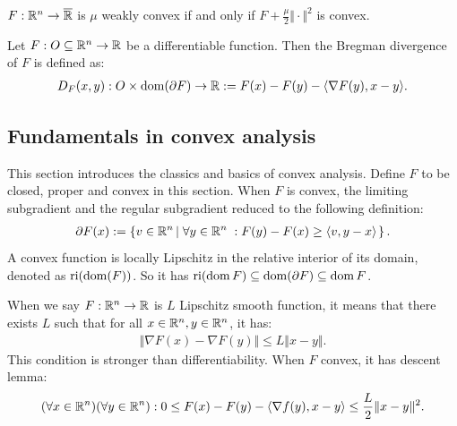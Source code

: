 \documentclass[12pt]{article}
\begin{document}
        \begin{definition}
            $F: \mathbb R^n \rightarrow \overline {\mathbb R}$ is $\mu$ weakly convex if and only if $F + \frac{\mu}{2}\Vert \cdot\Vert^2$ is convex. 
        \end{definition}
        \begin{definition}
            Let $F: O \subseteq \mathbb R^n \rightarrow \mathbb R$ be a differentiable function. 
            Then the Bregman divergence of $F$ is defined as: 
            \begin{align*}
                D_F(x, y): O \times \operatorname{dom}(\partial F) \rightarrow \mathbb R
                := F(x) - F(y) - \langle \nabla F(y), x - y\rangle. 
            \end{align*}
        \end{definition}
    \subsection{Fundamentals in convex analysis}
        This section introduces the classics and basics of convex analysis. 
        Define $F$ to be closed, proper and convex in this section. 
        When $F$ is convex, the limiting subgradient and the regular subgradient reduced to the following definition:
        \begin{align*}
            \partial F(x) := \left\lbrace
                v \in \mathbb R^n \left|\; 
                    \forall y \in \mathbb R^n\; :  F(y) - F(x)  \ge \langle v, y - x\rangle
                \right.
            \right\rbrace. 
        \end{align*}
        A convex function is locally Lipschitz in the relative interior of its domain, denoted as $\operatorname{ri}(\operatorname{dom}(F))$. 
        So it has $\operatorname{ri}(\operatorname{dom} F)\subseteq \operatorname{dom}(\partial F) \subseteq \operatorname{dom} F$. 
        \par
        When we say $F:\mathbb R^n \rightarrow \mathbb R$ is $L$ Lipschitz smooth function, it means that there exists $L$ such that for all $x\in \mathbb R^n, y \in \mathbb R^n$, it has: 
        \begin{align*}
            \Vert \nabla F(x) - \nabla F(y)\Vert \le L \Vert x - y\Vert. 
        \end{align*}
        This condition is stronger than differentiability. 
        When $F$ convex, it has descent lemma: 
        \begin{align*}
            (\forall x \in \mathbb R^n)(\forall y \in \mathbb R^n): 0 \le 
            F(x) - F(y) - \langle \nabla f(y), x - y\rangle \le \frac{L}{2}\Vert x - y\Vert^2. 
        \end{align*}
\end{document}
